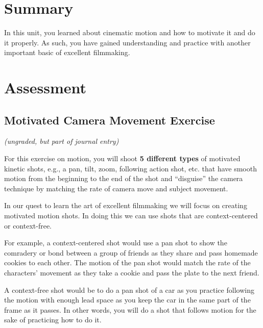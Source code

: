 \documentclass[
]{book}
\begin{document}
\hypertarget{summary-3}{%
\section*{Summary}\label{summary-3}}

In this unit, you learned about cinematic motion and how to motivate it and do it properly. As such, you have gained understanding and practice with another important basic of excellent filmmaking.

\hypertarget{assessment-3}{%
\section*{Assessment}\label{assessment-3}}

\begin{assessment}
\hypertarget{motivated-camera-movement-exercise}{%
\section*{Motivated Camera Movement Exercise}\label{motivated-camera-movement-exercise}}

\emph{(ungraded, but part of journal entry)}

For this exercise on motion, you will shoot \textbf{5 different types} of motivated kinetic shots, e.g., a pan, tilt, zoom, following action shot, etc. that have smooth motion from the beginning to the end of the shot and ``disguise'' the camera technique by matching the rate of camera move and subject movement.

In our quest to learn the art of excellent filmmaking we will focus on creating motivated motion shots. In doing this we can use shots that are context-centered or context-free.

For example, a context-centered shot would use a pan shot to show the comradery or bond between a group of friends as they share and pass homemade cookies to
each other. The motion of the pan shot would match the rate of the characters' movement as they take a cookie and pass the plate to the next friend.

A context-free shot would be to do a pan shot of a car as you practice following the motion with enough lead space as you keep the car in the same part of the
frame as it passes. In other words, you will do a shot that follows motion for the sake of practicing how to do it.


\end{assessment}
\end{document}
